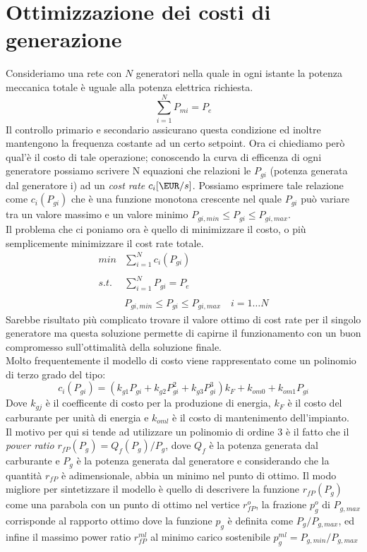 ﻿\label{capitolo5}
\section{Ottimizzazione dei costi di generazione}
Consideriamo una rete con $N$ generatori nella quale in ogni istante la potenza meccanica totale è uguale alla potenza elettrica richiesta.
$$\sum_{i=1}^{N}P_{mi}= P_e$$
Il controllo primario e secondario assicurano questa condizione ed inoltre mantengono la frequenza costante ad un certo setpoint. Ora ci chiediamo però qual'è il costo di tale operazione; conoscendo la curva di efficenza di ogni generatore possiamo scrivere N equazioni che relazioni le $P_{gi}$ (potenza generata dal generatore i) ad un \emph{cost rate} $c_i[\EUR/s]$. Possiamo esprimere tale relazione come $c_i(P_{gi})$ che è una funzione monotona crescente nel quale $P_{gi}$ può variare tra un valore massimo e un valore minimo $P_{gi,min}\leq P_{gi}\leq P_{gi,max}$.\\
Il problema che ci poniamo ora è quello di minimizzare il costo, o più semplicemente minimizzare il cost rate totale.
$$
\begin{array}{cc}
min &\sum_{i=1}^N c_i(P_{gi})\\
\\
s.t. &\sum_{i=1}^NP_{gi}=P_e\\
\\
&P_{gi,min}\leq P_{gi}\leq P_{gi,max} \quad i=1\dots N
\end{array}
$$
Sarebbe risultato più complicato trovare il valore ottimo di cost rate per il singolo generatore ma questa soluzione permette di capirne il funzionamento con un buon compromesso sull'ottimalità della soluzione finale.\\
Molto frequentemente il modello di costo viene rappresentato come un polinomio di terzo grado del tipo:
$$c_i(P_{gi})=(k_{g1}P_{gi}+k_{g2}P_{gi}^2+k_{g3}P_{gi}^3)k_F+k_{om0}+k_{om1}P_{gi}$$
Dove $k_{gj}$ è il coefficente di costo per la produzione di energia, $k_F$ è il costo del carburante per unità di energia e $k_{om\textit{l}}$ è il costo di mantenimento dell'impianto.\\
Il motivo per qui si tende ad utilizzare un polinomio di ordine 3 è il fatto che il \emph{power ratio} $r_{fP}(P_g)=Q_f(P_g)/P_g$, dove $Q_f$ è la potenza generata dal carburante e $P_g$ è la potenza generata dal generatore e considerando che la quantità $r_{fP}$ è adimensionale, abbia un minimo nel punto di ottimo. Il modo migliore per sintetizzare il modello è quello di descrivere la funzione $r_{fP}(P_g)$ come una parabola con un punto di ottimo nel vertice $r_{fP}^o$, la frazione $p_g^o$ di $ P_{g,max}$ corrisponde al rapporto ottimo dove la funzione $p_g$ è definita come $P_g/P_{g,max}$, ed infine il massimo power ratio $r_{fP}^{ml}$ al minimo carico sostenibile 	$p_g^{ml}= P_{g,min} /P_{g,max}$
